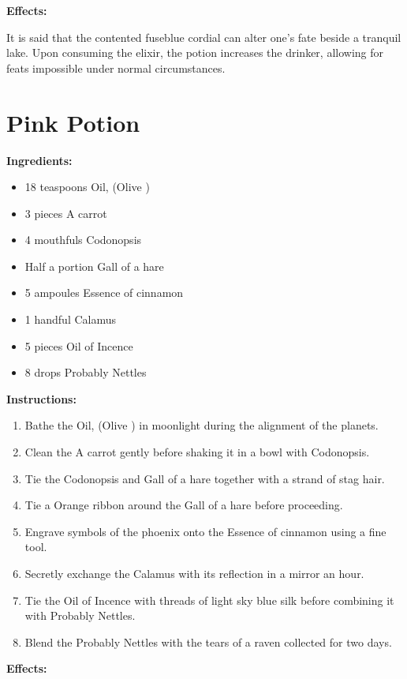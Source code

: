 \documentclass{article}
\begin{document}
\textbf{Effects:}

It is said that the contented fuseblue cordial can alter one's fate beside a tranquil lake. Upon consuming the elixir, the potion increases the drinker, allowing for feats impossible under normal circumstances.

\newpage
\section*{Pink Potion}

\textbf{Ingredients:}

\begin{itemize}
  \item 18 teaspoons Oil, (Olive )
  \item 3 pieces A carrot
  \item 4 mouthfuls Codonopsis
  \item Half a portion Gall of a hare
  \item 5 ampoules Essence of cinnamon
  \item 1 handful Calamus
  \item 5 pieces Oil of Incence
  \item 8 drops Probably Nettles
\end{itemize}

\textbf{Instructions:}

\begin{enumerate}
  \item Bathe the Oil, (Olive ) in moonlight during the alignment of the planets.
  \item Clean the A carrot gently before shaking it in a bowl with Codonopsis.
  \item Tie the Codonopsis and Gall of a hare together with a strand of stag hair.
  \item Tie a Orange ribbon around the Gall of a hare before proceeding.
  \item Engrave symbols of the phoenix onto the Essence of cinnamon using a fine tool.
  \item Secretly exchange the Calamus with its reflection in a mirror an hour.
  \item Tie the Oil of Incence with threads of light sky blue silk before combining it with Probably Nettles.
  \item Blend the Probably Nettles with the tears of a raven collected for two days.
\end{enumerate}

\textbf{Effects:}
\end{document}
